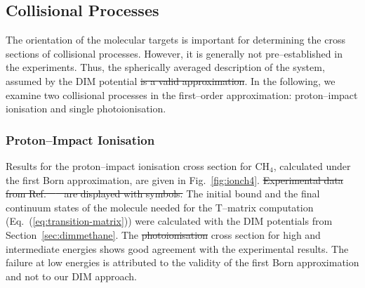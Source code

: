 \documentclass[10pt]{article}
\providecommand{\DIFaddtex}[1]{{\protect\color{blue}\uwave{#1}}} %
\providecommand{\DIFdeltex}[1]{{\protect\color{red}\sout{#1}}}                      %
\providecommand{\DIFaddbegin}{} %
\providecommand{\DIFaddend}{} %
\providecommand{\DIFdelbegin}{} %
\providecommand{\DIFdelend}{} %
\providecommand{\DIFadd}[1]{\texorpdfstring{\DIFaddtex{#1}}{#1}} %
\providecommand{\DIFdel}[1]{\texorpdfstring{\DIFdeltex{#1}}{}} %
\begin{document}
\subsection{Collisional Processes}

The orientation of the molecular targets is important for determining
the cross sections of collisional processes. However, it is generally 
not pre--established in the experiments. Thus, the spherically 
averaged description of the system, assumed by the DIM potential 
\DIFdelbegin \DIFdel{is a valid approximation}\DIFdelend \DIFaddbegin \DIFadd{makes sense}\DIFaddend . In the following, we examine two collisional processes 
in the first--order approximation: proton--impact ionisation and 
single photoionisation. 

\subsubsection{Proton--Impact Ionisation}

Results for the proton--impact ionisation cross section for CH$_4$,
calculated under the first Born approximation, are given in 
Fig.~\ref{fig:ionch4}. \DIFdelbegin \DIFdel{Experimental data from Ref.~\mbox{%
\cite{Rudd1983,Rudd1985}
}%
are displayed 
with symbols. }\DIFdelend The initial bound and the final continuum 
states of the molecule needed for the T--matrix computation 
(Eq.~(\ref{eq:transition-matrix})) were calculated with the DIM 
potentials from Section~\ref{sec:dimmethane}. The \DIFdelbegin \DIFdel{photoionisation }\DIFdelend \DIFaddbegin \DIFadd{ionisation }\DIFaddend cross 
section for high and intermediate energies shows good agreement with 
the experimental results. The failure at low energies is attributed 
to the validity of the first Born approximation and not to our DIM 
approach.
\end{document}
